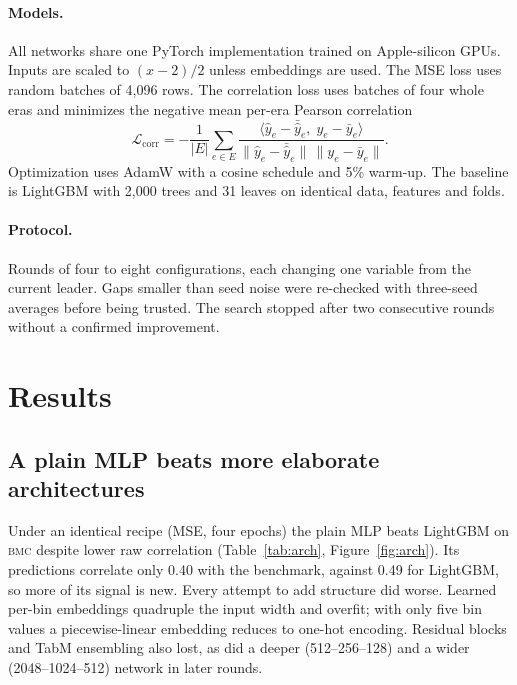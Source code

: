 \documentclass[11pt]{article}
\newcommand{\bmc}{\textsc{bmc}}
\begin{document}
\paragraph{Models.} All networks share one PyTorch implementation trained on Apple-silicon GPUs.
Inputs are scaled to $(x-2)/2$ unless embeddings are used. The MSE loss uses random batches of
4,096 rows. The correlation loss uses batches of four whole eras and minimizes the negative mean
per-era Pearson correlation
\begin{equation}
  \mathcal{L}_{\text{corr}} = -\frac{1}{|E|}\sum_{e\in E}
  \frac{\langle \hat y_e - \bar{\hat y}_e,\; y_e - \bar y_e\rangle}
       {\lVert \hat y_e - \bar{\hat y}_e\rVert\,\lVert y_e - \bar y_e\rVert}.
\end{equation}
Optimization uses AdamW with a cosine schedule and 5\% warm-up. The baseline is LightGBM with
2,000 trees and 31 leaves on identical data, features and folds.

\paragraph{Protocol.} Rounds of four to eight configurations, each changing one variable from
the current leader. Gaps smaller than seed noise were re-checked with three-seed averages
before being trusted. The search stopped after two consecutive rounds without a confirmed
improvement.

\section{Results}

\subsection{A plain MLP beats more elaborate architectures}

Under an identical recipe (MSE, four epochs) the plain MLP beats LightGBM on \bmc{} despite
lower raw correlation (Table~\ref{tab:arch}, Figure~\ref{fig:arch}). Its predictions correlate
only 0.40 with the benchmark, against 0.49 for LightGBM, so more of its signal is new. Every
attempt to add structure did worse. Learned per-bin embeddings quadruple the input width and
overfit; with only five bin values a piecewise-linear embedding \citep{gorishniy2022embeddings}
reduces to one-hot encoding. Residual blocks and TabM ensembling also lost, as did a deeper
(512--256--128) and a wider (2048--1024--512) network in later rounds.
\end{document}
